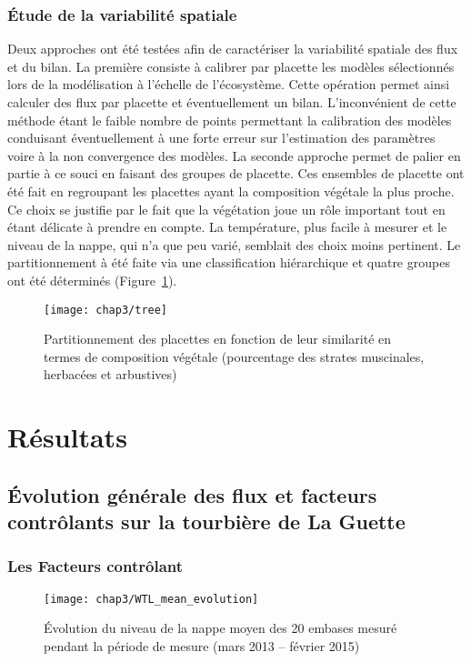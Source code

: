 \subsubsection{Étude de la variabilité spatiale}

Deux approches ont été testées afin de caractériser la variabilité spatiale des flux et du bilan.
La première consiste à calibrer par placette les modèles sélectionnés lors de la modélisation à l'échelle de l'écosystème.
Cette opération permet ainsi calculer des flux par placette et éventuellement un bilan.
L'inconvénient de cette méthode étant le faible nombre de points permettant la calibration des modèles conduisant éventuellement à une forte erreur sur l'estimation des paramètres voire à la non convergence des modèles.
La seconde approche permet de palier en partie à ce souci en faisant des groupes de placette.
Ces ensembles de placette ont été fait en regroupant les placettes ayant la composition végétale la plus proche.
Ce choix se justifie par le fait que la végétation joue un rôle important tout en étant délicate à prendre en compte.
La température, plus facile à mesurer et le niveau de la nappe, qui n'a que peu varié, semblait des choix moins pertinent. 
Le partitionnement à été faite via une classification hiérarchique et quatre groupes ont été déterminés (Figure~\ref{fig:tree}).

\begin{figure}[t]
\centering
\texttt{[image: chap3/tree]}
\caption{Partitionnement des placettes en fonction de leur similarité en termes de composition végétale (pourcentage des strates muscinales, herbacées et arbustives)}
\label{fig:tree}
\end{figure}



\section{Résultats}

\subsection{Évolution générale des flux et facteurs contrôlants sur la tourbière de La Guette}

\subsubsection{Les Facteurs contrôlant}

\begin{figure}
\centering
\texttt{[image: chap3/WTL\_mean\_evolution]}
\caption{Évolution du niveau de la nappe moyen des 20 embases mesuré pendant la période de mesure (mars 2013 -- février 2015)}
\label{fig:WTL_mean_evolution}
\end{figure}

